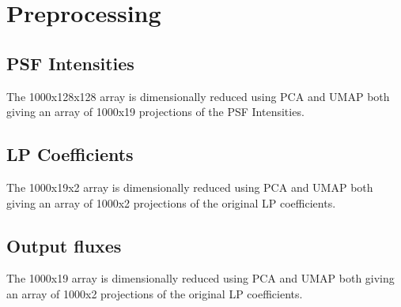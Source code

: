 \section{Preprocessing}

	\subsection{PSF Intensities}
		The 1000x128x128 array is dimensionally reduced using PCA and UMAP both giving an array of 1000x19 projections of the PSF Intensities.
		
	\subsection{LP Coefficients}
		The 1000x19x2 array is dimensionally reduced using PCA and UMAP both giving an array of 1000x2 projections of the original LP coefficients.
		
	\subsection{Output fluxes}
		The 1000x19 array is dimensionally reduced using PCA and UMAP both giving an array of 1000x2 projections of the original LP coefficients.